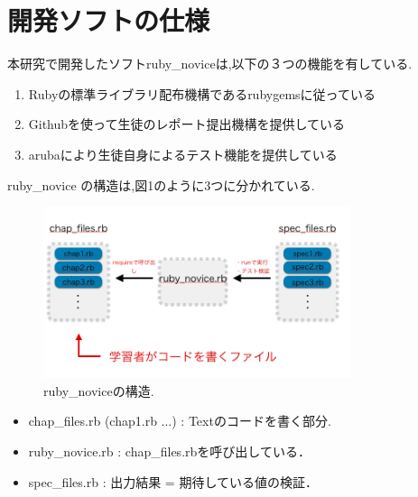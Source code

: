 \documentclass[10pt,a4j,twocolumn]{jsarticle}
\begin{document}
\section{開発ソフトの仕様}
本研究で開発したソフトruby\_noviceは,以下の３つの機能を有している.
\begin{enumerate}
\item  Rubyの標準ライブラリ配布機構であるrubygemsに従っている
\item Githubを使って生徒のレポート提出機構を提供している
\item arubaにより生徒自身によるテスト機能を提供している
\end{enumerate}


ruby\_novice の構造は,図1のように3つに分かれている.
\begin{figure}[H]
\begin{center}
     \includegraphics[width=9cm, bb=0 0 644 342]{abst.jpg}
     \caption{ruby\_noviceの構造.}
\end{center}
\end{figure}

\begin{itemize}

\item chap\_files.rb (chap1.rb ...) : Textのコードを書く部分.

\item ruby\_novice.rb : chap\_files.rbを呼び出している．

\item spec\_files.rb : 出力結果 = 期待している値の検証．

\end{itemize}
\end{document}
